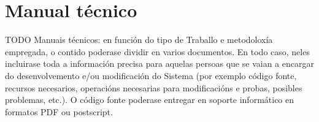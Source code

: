 \chapter{Manual técnico}
TODO
Manuais técnicos: en función do tipo de Traballo e metodoloxía empregada, o contido poderase dividir en varios documentos. En todo caso, neles incluirase toda a información precisa para aquelas persoas que se vaian a encargar do desenvolvemento e/ou modificación do Sistema (por exemplo código fonte, recursos necesarios, operacións necesarias para modificacións e probas, posibles problemas, etc.). O código fonte poderase entregar en soporte informático en formatos PDF ou postscript.
